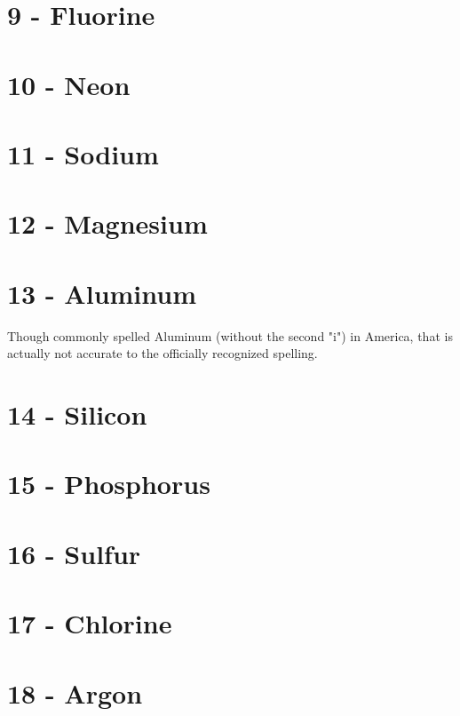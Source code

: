 \documentclass{book}
\begin{document}
\section{9 - Fluorine}
\label{sec:elem-fluorine}

\section{10 - Neon}
\label{sec:elem-neon}

\section{11 - Sodium}
\label{sec:elem-sodium}

\section{12 - Magnesium}
\label{sec:elem-magnesium}

\section{13 - Aluminum}
\label{sec:elem-aluminium}
Though commonly spelled Aluminum (without the second "i") in America, that is actually not accurate to the officially recognized spelling.

\section{14 - Silicon}
\label{sec:elem-silicon}

\section{15 - Phosphorus}
\label{sec:elem-phosphorus}

\section{16 - Sulfur}
\label{sec:elem-sulfur}

\section{17 - Chlorine}
\label{sec:elem-chlorine}

\section{18 - Argon}
\label{sec:elem-argon}
\end{document}
